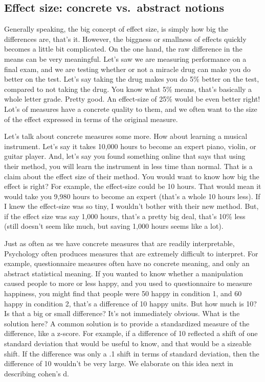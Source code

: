 \documentclass[
  letterpaper,
  DIV=11,
  numbers=noendperiod]{scrreprt}
\begin{document}
\subsection{Effect size: concrete vs.~abstract
notions}\label{effect-size-concrete-vs.-abstract-notions}

Generally speaking, the big concept of effect size, is simply how big
the differences are, that's it. However, the biggness or smallness of
effects quickly becomes a little bit complicated. On the one hand, the
raw difference in the means can be very meaningful. Let's saw we are
measuring performance on a final exam, and we are testing whether or not
a miracle drug can make you do better on the test. Let's say taking the
drug makes you do 5\% better on the test, compared to not taking the
drug. You know what 5\% means, that's basically a whole letter grade.
Pretty good. An effect-size of 25\% would be even better right! Lot's of
measures have a concrete quality to them, and we often want to the size
of the effect expressed in terms of the original measure.

Let's talk about concrete measures some more. How about learning a
musical instrument. Let's say it takes 10,000 hours to become an expert
piano, violin, or guitar player. And, let's say you found something
online that says that using their method, you will learn the instrument
in less time than normal. That is a claim about the effect size of their
method. You would want to know how big the effect is right? For example,
the effect-size could be 10 hours. That would mean it would take you
9,980 hours to become an expert (that's a whole 10 hours less). If I
knew the effect-size was so tiny, I wouldn't bother with their new
method. But, if the effect size was say 1,000 hours, that's a pretty big
deal, that's 10\% less (still doesn't seem like much, but saving 1,000
hours seems like a lot).

Just as often as we have concrete measures that are readily
interpretable, Psychology often produces measures that are extremely
difficult to interpret. For example, questionnaire measures often have
no concrete meaning, and only an abstract statistical meaning. If you
wanted to know whether a manipulation caused people to more or less
happy, and you used to questionnaire to measure happiness, you might
find that people were 50 happy in condition 1, and 60 happy in condition
2, that's a difference of 10 happy units. But how much is 10? Is that a
big or small difference? It's not immediately obvious. What is the
solution here? A common solution is to provide a standardized measure of
the difference, like a z-score. For example, if a difference of 10
reflected a shift of one standard deviation that would be useful to
know, and that would be a sizeable shift. If the difference was only a
.1 shift in terms of standard deviation, then the difference of 10
wouldn't be very large. We elaborate on this idea next in describing
cohen's d.
\end{document}
